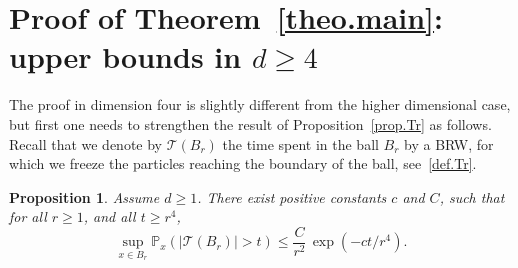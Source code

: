 \documentclass[JEP,XML,SOM,Unicode,NoFloatCountersInSection,published]{cedram}
\theoremstyle{plain}
\newtheorem{proposition}[theorem]{Proposition}
\theoremstyle{definition}
\newcommand{\1}{{\text{\Large $\mathfrak 1$}}}
\begin{document}
\section{Proof of Theorem~\ref{theo.main}: upper bounds in \texorpdfstring{$d\ge 4$}{d4}}
\label{sec-UB4}

The proof in dimension four is slightly different from
the higher dimensional case, but first one needs
to strengthen the result of Proposition~\ref{prop.Tr} as follows.
Recall that we denote by $\mathcal T(B_r)$ the time spent in the ball $B_r$
by a BRW,
for which we freeze the particles reaching the
boundary of the ball, see~\eqref{def.Tr}.
\begin{proposition}\label{prop.Tr+}
Assume $d\ge 1$.
There exist positive constants $c$ and $C$, such that for all $r\ge 1$, and all $t\ge r^4$,\vspace*{-3pt}
\[
\sup_{x\in B_r} \mathbb P_x (|\mathcal T(B_r)|>t) \le \frac{C}{r^2}\, \exp(-ct/r^4).
\]
\end{proposition}
\end{document}
